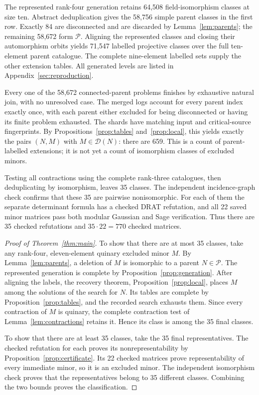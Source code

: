 \documentclass[11pt,a4paper]{article}
\theoremstyle{definition}
\begin{document}
The represented rank-four generation retains 64,508
field-isomorphism classes at size ten. Abstract deduplication
gives the 58,756 simple parent classes in the first row. Exactly
84 are disconnected and are discarded by
Lemma~\ref{lem:parents}; the remaining 58,672 form $\mathcal P$.
Aligning the represented classes and closing their automorphism
orbits yields 71,547 labelled projective classes over the full
ten-element parent catalogue. The complete nine-element labelled
sets supply the other extension tables. All generated levels
are listed in Appendix~\ref{sec:reproduction}.

Every one of the 58,672 connected-parent problems finishes by
exhaustive natural join, with no unresolved case. The merged
logs account for every parent index exactly once, with each
parent either excluded for being disconnected or having its
finite problem exhausted. The shards have matching input and
critical-source fingerprints. By Propositions~\ref{prop:tables}
and~\ref{prop:local}, this yields exactly the pairs $(N,M)$
with $M\in\mathcal D(N)$: there are 659. This is a count of
parent-labelled extensions; it is not yet a count of isomorphism
classes of excluded minors.

Testing all contractions using the complete rank-three
catalogues, then deduplicating by isomorphism, leaves 35
classes. The independent incidence-graph check confirms that
these 35 are pairwise nonisomorphic. For each of them the
separate determinant formula has a checked DRAT refutation,
and all 22 saved minor matrices pass both modular Gaussian and
Sage verification. Thus there are 35 checked refutations and
$35\cdot22=770$ checked matrices.

\begin{proof}[Proof of Theorem~\ref{thm:main}]
To show that there are at most 35 classes, take any rank-four,
eleven-element quinary excluded minor $M$. By
Lemma~\ref{lem:parents}, a deletion of $M$ is isomorphic to a
parent $N\in\mathcal P$. The represented generation is complete
by Proposition~\ref{prop:generation}. After aligning the labels,
the recovery theorem, Proposition~\ref{prop:local}, places $M$
among the solutions of the search for $N$. Its tables are
complete by Proposition~\ref{prop:tables}, and the recorded
search exhausts them. Since every contraction of $M$ is quinary,
the complete contraction test of Lemma~\ref{lem:contractions}
retains it. Hence its class is among the 35 final classes.

To show that there are at least 35 classes, take the 35 final
representatives. The checked refutation for each proves its
nonrepresentability by Proposition~\ref{prop:certificate}.
Its 22 checked matrices prove representability of every
immediate minor, so it is an excluded minor. The independent
isomorphism check proves that the representatives belong to
35 different classes. Combining the two bounds proves the
classification.
\end{proof}
\end{document}
